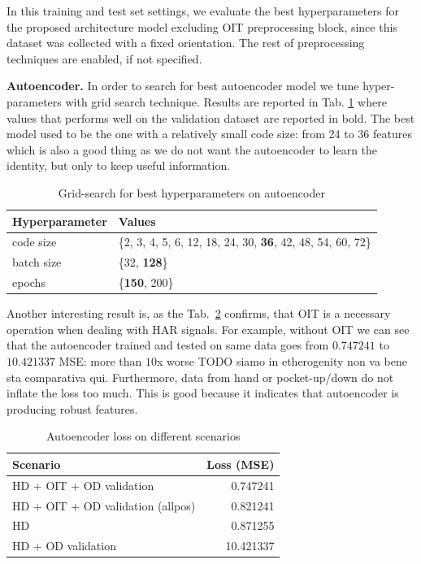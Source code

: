 In this training and test set settings, we evaluate the best
hyperparameters for the proposed architecture model excluding OIT
preprocessing block, since this dataset was collected with a fixed
orientation. The rest of preprocessing techniques are enabled, if not
specified.

\textbf{Autoencoder.}  In order to search for best autoencoder model
we tune hyper-parameters with grid search technique. Results are
reported in Tab. \ref{tab:ae-hyperparams} where values that performs
well on the validation dataset are reported in bold.  The best model
used to be the one with a relatively small code size: from 24 to 36
features which is also a good thing as we do not want the autoencoder
to learn the identity, but only to keep useful information.
\begin{table}[H]
  \centering
  \begin{tabular}{lp{4cm}}
    \hline
    Hyperparameter & Values \\
    \hline
    code size & \{2, 3, 4, 5, 6, 12, 18, 24, 30, \textbf{36}, 42, 48, 54, 60, 72\} \\
    batch size & \{32, \textbf{128}\} \\
    epochs & \{\textbf{150}, 200\} \\
    \hline
  \end{tabular}
  \caption{Grid-search for best hyperparameters on autoencoder}
  \label{tab:ae-hyperparams}
\end{table}

Another interesting result is, as the Tab.~\ref{tab:ae-loss} confirms,
that OIT is a necessary
operation when dealing with HAR signals. For example, without OIT we
can see that the autoencoder trained and tested on same data goes from
$0.747241$ to $10.421337$ MSE: more than $10$x worse TODO siamo in etherogenity non va bene sta comparativa qui. Furthermore,
data from hand or pocket-up/down do not inflate the loss too
much. This is good because it indicates that autoencoder is producing
robust features.
\begin{table}[H]
  \centering
  \begin{tabular}{lr}
    \hline
    Scenario & Loss (MSE) \\
    \hline
    HD + OIT + OD validation & 0.747241 \\
    HD + OIT + OD validation (allpos) & 0.821241 \\
    HD & 0.871255 \\
    HD + OD validation & 10.421337 \\
    \hline
  \end{tabular}
  \caption{Autoencoder loss on different scenarios}
  \label{tab:ae-loss}
\end{table}

